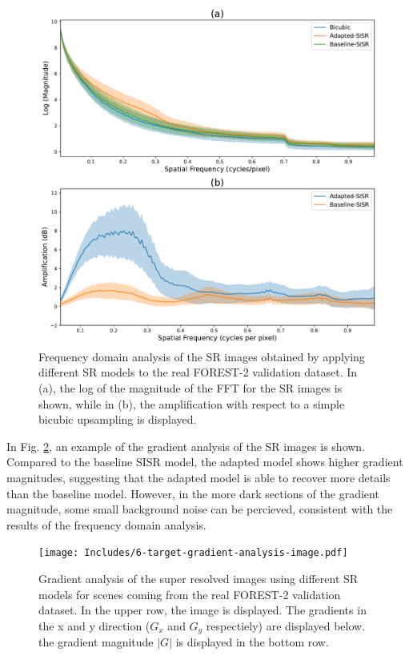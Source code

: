         \begin{figure}[H]
            \centering
            \includegraphics[scale=0.5]{Includes/5-target-amplification-statistics.pdf}
            \caption{Frequency domain analysis of the SR images obtained by applying different SR models to the real FOREST-2 validation dataset.
            In (a), the log of the magnitude of the FFT for the SR images is shown,
            while in (b), the amplification with respect to a  simple bicubic upsampling is displayed.}
            \label{fig:5-target-amplification-statistics}
        \end{figure}


        In Fig. \ref{fig:6-target-gradient-analysis-image}, an example of the gradient analysis of the SR images is shown. 
        Compared to the baseline SISR model, the adapted model shows higher gradient magnitudes, suggesting that the adapted model is able to recover more details than the baseline model. 
        However, in the more dark sections of the gradient magnitude, some small background noise can be percieved, consistent with the results of the frequency domain analysis.

        \begin{figure}[H]
            \centering
            \texttt{[image: Includes/6-target-gradient-analysis-image.pdf]}
            \caption{Gradient analysis of the super resolved images using different SR models for scenes coming from the real FOREST-2 validation dataset.
                     In the upper row, the image is displayed. The gradients in the x and y direction ($G_x$ and $G_y$ respectiely) are displayed below.
                     the gradient magnitude $|G|$ is displayed in the bottom row.}
            \label{fig:6-target-gradient-analysis-image}
        \end{figure}

